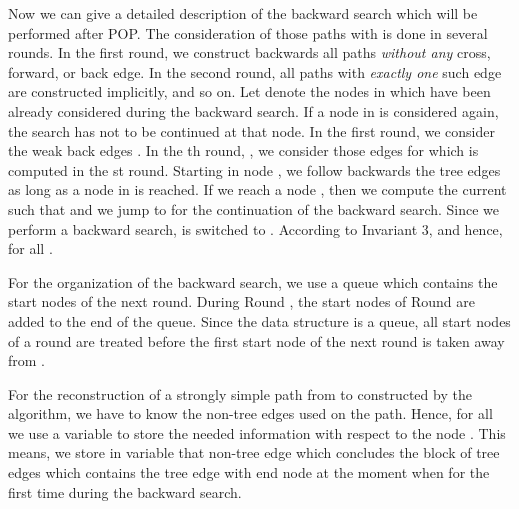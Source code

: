 \documentclass[12pt,twoside,a4paper]{article}
\begin{document}
Now we can give a detailed description of the backward search which will be 
performed after POP.
The consideration of those paths  with 
is done in several rounds.
In the first round, we construct backwards all paths {\em without any\/} cross,
forward, or back edge.
In the second round, all paths with {\em exactly one} such edge are constructed
implicitly, and so on.
Let  denote the nodes in  which have been already considered during 
the backward search. If a node in  is considered again, the search has not 
to be continued at that node.
In the first round, we consider the weak back edges . In the th
round, , we consider those edges  for which
 is computed in the st round.
Starting in node , we follow backwards the tree edges as long as 
a node in  is reached. If we reach a node , then 
we compute the current  such that  and we jump to
 for the continuation of the backward search. Since we perform a backward
search,  is switched to . According to 
Invariant 3,  and hence,  for all 
. 

For the organization of the backward search, we use a queue  which contains
the start nodes of the next round. During Round , the start nodes of Round  
are added to the end of the queue. Since the data structure is a queue, all start
nodes of a round are treated before the first start node of the next round is taken
away from .

For the reconstruction of a strongly simple path from  to  constructed
by the algorithm, we have to know the non-tree edges used on the path. Hence, 
for all  we use a variable  to store the needed information
with respect to the node . This means, we store in variable  that non-tree
edge which concludes the block of tree edges which contains the tree edge with end 
node  at the moment when  for the first time 
during the backward search.
\end{document}
